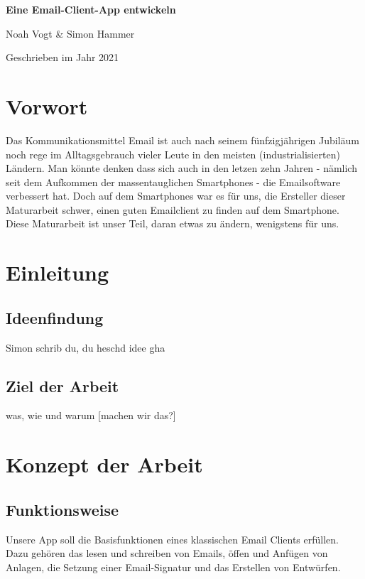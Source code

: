 \documentclass[a4paper,11pt]{article}
\begin{document}
\begin{titlepage}

\vspace*{1cm}
	\centering
	
	{\huge\bfseries Eine Email-Client-App entwickeln \par}
	\vspace{0.5cm}
	{\Large Noah Vogt \& Simon Hammer\par}
	\vspace{17cm}

	{\large Geschrieben im Jahr 2021\par}
	
\end{titlepage}

\tableofcontents
\pagebreak

\section{Vorwort}
Das Kommunikationsmittel Email ist auch nach seinem fünfzigjährigen Jubiläum noch rege im Alltagsgebrauch vieler Leute in den meisten (industrialisierten) Ländern. Man könnte denken dass sich auch in den letzen zehn Jahren - nämlich seit dem Aufkommen der massentauglichen Smartphones - die Emailsoftware verbessert hat. Doch auf dem Smartphones war es für uns, die Ersteller dieser Maturarbeit schwer, einen guten Emailclient zu finden auf dem Smartphone. Diese Maturarbeit ist unser Teil, daran etwas zu ändern, wenigstens für uns.
\section{Einleitung}
\subsection{Ideenfindung}
Simon schrib du, du heschd idee gha
\subsection{Ziel der Arbeit}

 was, wie und warum [machen wir das?]

\section{Konzept der Arbeit}

\subsection{Funktionsweise}
Unsere App soll die Basisfunktionen eines klassischen Email Clients erfüllen. Dazu gehören das lesen und schreiben von Emails, öffen und Anfügen von Anlagen, die Setzung einer Email-Signatur und das Erstellen von Entwürfen.
\end{document}
